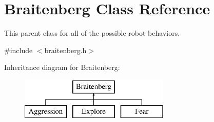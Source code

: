\hypertarget{class_braitenberg}{}\section{Braitenberg Class Reference}
\label{class_braitenberg}


This parent class for all of the possible robot behaviors.  




{\ttfamily \#include $<$braitenberg.\+h$>$}

Inheritance diagram for Braitenberg\+:\begin{figure}[H]
\begin{center}
\leavevmode
\includegraphics[height=2.000000cm]{class_braitenberg}
\end{center}
\end{figure}
